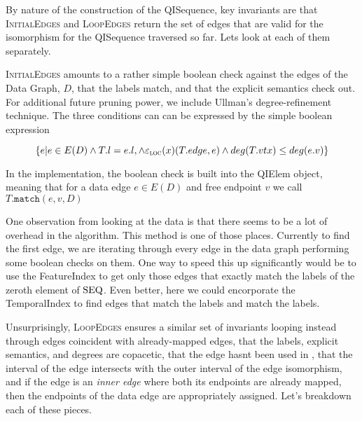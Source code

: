 By nature of the construction of the QISequence, key invariants are that
\textsc{InitialEdges} and \textsc{LoopEdges} return the set of edges that are
valid for the isomorphism for the QISequence traversed so far. Lets look at each
of them separately.

\textsc{InitialEdges} amounts to a rather simple boolean check against the edges
of the Data Graph, $D$, that the labels match, and that the explicit semantics
check out. For additional future pruning power, we include Ullman's
degree-refinement technique. The three conditions can can be expressed by the
simple boolean expression

\[\{e | e \in E(D) \wedge T.l = e.l, \wedge \varepsilon_{\textsc{loc}}(x)(T.edge, e) \wedge
deg(T.vtx) \leq deg(e.v) \}\]

In the implementation, the boolean check is built into the QIElem object,
meaning that for a data edge $e \in E(D)$ and free endpoint $v$ we call
$T.\texttt{match}(e, v, D)$

One observation from looking at the data is that there seems to be a lot of
overhead in the algorithm. This method is one of those places. Currently to find
the first edge, we are iterating through every edge in the data graph performing
some boolean checks on them. One way to speed this up significantly would be to
use the FeatureIndex to get only those edges that exactly match the labels of
the zeroth element of ${\text{SEQ}}$. Even better, here we could encorporate the
TemporalIndex to find edges that match the labels and match the labels.


Unsurprisingly, \textsc{LoopEdges} ensures a similar set of invariants looping
instead through edges coincident with already-mapped edges, that the labels,
explicit semantics, and degrees are copacetic, that the edge hasnt been used in
\iso, that the interval of the edge intersects with the outer interval of the
edge isomorphism, and if the edge is an \textit{inner edge} where both its
endpoints are already mapped, then the endpoints of the data edge are
appropriately assigned.  Let's breakdown each of these pieces.

